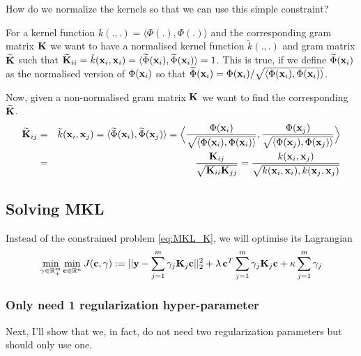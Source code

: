 How do we normalize the kernels so that we can use this simple constraint?

For a kernel function $k(.,.) = \langle \Phi(.), \Phi(.) \rangle$ and the corresponding gram matrix $\mathbf{K}$ we want to have a normalised kernel function $\tilde{k}(.,.)$ and gram matrix $\mathbf{\widetilde{K}}$ such that $\mathbf{\widetilde{K}}_{ii} = \tilde{k}(\mathbf{x}_i,\mathbf{x}_i) = \langle \widetilde{\Phi}(\mathbf{x}_i), \widetilde{\Phi}(\mathbf{x}_i) \rangle = 1$.
This is true, if we define $\widetilde{\Phi}(\mathbf{x}_i)$ as the normalised version of $\Phi(\mathbf{x}_i)$ so that $\widetilde{\Phi}(\mathbf{x}_i) = \Phi(\mathbf{x}_i) / \sqrt{\langle \Phi(\mathbf{x}_i), \Phi(\mathbf{x}_i) \rangle}$.

Now, given a non-normalised gram matrix $\mathbf{K}$ we want to find the corresponding $\mathbf{\widetilde{K}}$.
\begin{eqnarray}
\mathbf{\widetilde{K}}_{ij} & = & \tilde{k}(\mathbf{x}_i,\mathbf{x}_j) 
= \langle \widetilde{\Phi}(\mathbf{x}_i), \widetilde{\Phi}(\mathbf{x}_j) \rangle 
= \Big\langle \frac{\Phi(\mathbf{x}_i)}{\sqrt{\langle \Phi(\mathbf{x}_i), \Phi(\mathbf{x}_i) \rangle}}, \frac{\Phi(\mathbf{x}_j)}{\sqrt{\langle \Phi(\mathbf{x}_j), \Phi(\mathbf{x}_j) \rangle}} \Big\rangle  \nonumber \\
& = & \frac{\mathbf{K}_{ij}}{\sqrt{\mathbf{K}_{ii} \mathbf{K}_{jj}}}
= \frac{k(\mathbf{x}_i,\mathbf{x}_j)}{\sqrt{k(\mathbf{x}_i,\mathbf{x}_i),k(\mathbf{x}_j,\mathbf{x}_j)}} 
\end{eqnarray}

\subsection{Solving MKL}

Instead of the constrained problem \eqref{eq:MKL_K}, we will optimise its Lagrangian
\begin{equation}\label{eq:MKL_K_Lagrange}
\min_{\gamma \in \mathbb{R}^m_+} \min_{\mathbf{c} \in \mathbb{R}^n} J(\mathbf{c},\mathbf{\gamma}):= ||\mathbf{y} - \sum_{j=1}^m \gamma_j \mathbf{K}_j \mathbf{c}||_2^2 +
\lambda \, \mathbf{c}^T \sum_{j=1}^m \gamma_j \mathbf{K}_j \mathbf{c} + \kappa \sum_{j=1}^m \gamma_j
\end{equation}

\subsubsection{Only need 1 regularization hyper-parameter}
Next, I'll show that we, in fact, do not need two regularization parameters but should only use one.


